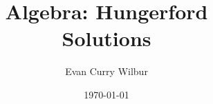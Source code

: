 \documentclass[a4paper,12pt]{book}
\newcommand\<{\ensuremath{\left\langle}}
\renewcommand\>{\ensuremath{\right\rangle}}
\begin{document}
\author{Evan Curry Wilbur}
\title{Algebra: Hungerford\\%
	\large Solutions%
	}
\date{\today}

\frontmatter
\maketitle



\tableofcontents

\mainmatter




\backmatter
\end{document}
